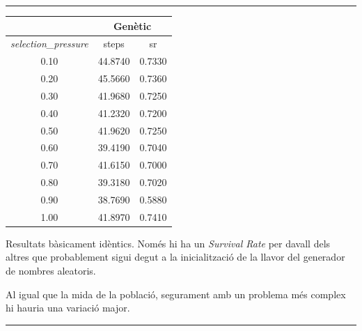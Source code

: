 \documentclass[12pt,a4paper]{report}
\begin{document}
\vspace*{10pt}\hrule

\begin{minipage}{0.3\textwidth}
  \centering
  \begin{tabular}{| c | c c |}
    \hline
      & \multicolumn{2}{|c|}{Genètic} \\
    \hline
    \textit{selection\_pressure} & steps & sr \\
    \hline
    0.10 & 44.8740 & 0.7330 \\
    0.20 & 45.5660 & 0.7360 \\
    0.30 & 41.9680 & 0.7250 \\
    0.40 & 41.2320 & 0.7200 \\
    0.50 & 41.9620 & 0.7250 \\
    0.60 & 39.4190 & 0.7040 \\
    0.70 & 41.6150 & 0.7000 \\
    0.80 & 39.3180 & 0.7020 \\
    0.90 & 38.7690 & 0.5880 \\
    1.00 & 41.8970 & 0.7410 \\
    \hline
  \end{tabular}
\end{minipage}
\hfill
\begin{minipage}{0.5\textwidth}
  Resultats bàsicament idèntics. Només hi ha un \textit{Survival Rate} per davall dels altres que probablement
  sigui degut a la inicialització de la llavor del generador de nombres aleatoris.

  Al igual que la mida de la població, segurament amb un problema més complex hi hauria una variació major.
\end{minipage}

\vspace*{10pt}\hrule
\end{document}
